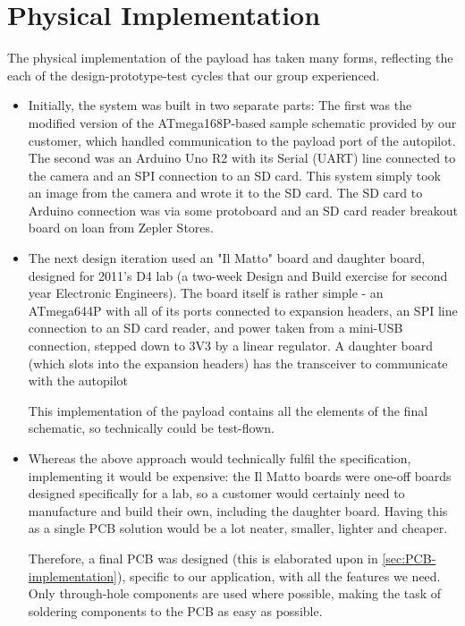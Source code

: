 
\section{Physical Implementation}

The physical implementation of the payload has taken many forms, reflecting 
the each of the design-prototype-test cycles that our group experienced.

\begin{itemize}
\item Initially, the system was built in two separate parts: The first was 
the modified version of the ATmega168P-based sample schematic provided by 
our customer, which handled communication to the payload port of the 
autopilot. The second was an Arduino Uno R2 with its Serial (UART) line 
connected to the camera and an SPI connection to an SD card. This system 
simply took an image from the camera and wrote it to the SD card. The SD card 
to Arduino connection was via some protoboard and an SD card reader breakout 
board on loan from Zepler Stores.
\item The next design iteration used an "Il Matto" board and daughter board, 
designed for 2011's D4 lab (a two-week Design and Build exercise for second 
year Electronic Engineers). The board itself is rather simple - an ATmega644P 
with all of its ports connected to expansion headers, an SPI line connection 
to an SD card reader, and power taken from a mini-USB connection, stepped 
down to 3V3 by a linear regulator. A daughter board (which slots into the 
expansion headers) has the transceiver to communicate with the autopilot

This implementation of the payload contains all the elements of the final 
schematic, so technically could be test-flown.
\item Whereas the above approach would technically fulfil the specification, 
implementing it would be expensive: the Il Matto boards were one-off boards 
designed specifically for a lab, so a customer would certainly need to 
manufacture and build their own, including the daughter board. Having this as 
a single PCB solution would be a lot neater, smaller, lighter and cheaper.

Therefore, a final PCB was designed (this is elaborated upon in 
\ref{sec:PCB-implementation}), specific to our application, with all the 
features we need. Only through-hole components are used where possible, 
making the task of soldering components to the PCB as easy as possible.
\end{itemize}
